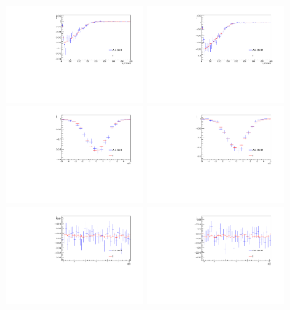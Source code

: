 \begin{figure} \centering
  \includegraphics[width=0.4\textwidth]{fig/chapt4/gen_plots/lplus_pt_compare.pdf}
  \includegraphics[width=0.4\textwidth]{fig/chapt4/gen_plots/lminus_pt_compare.pdf}\\
  \includegraphics[width=0.4\textwidth]{fig/chapt4/gen_plots/lplus_eta_compare.pdf}
  \includegraphics[width=0.4\textwidth]{fig/chapt4/gen_plots/lminus_eta_compare.pdf}\\
  \includegraphics[width=0.4\textwidth]{fig/chapt4/gen_plots/lplus_phi_compare.pdf}
  \includegraphics[width=0.4\textwidth]{fig/chapt4/gen_plots/lminus_phi_compare.pdf}

\end{figure}
